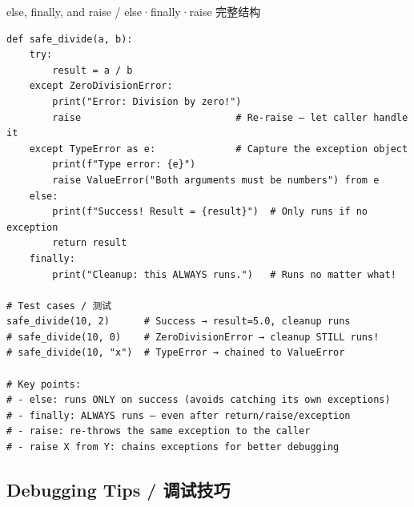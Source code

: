 \documentclass[11pt,a4paper]{report}
\begin{document}
\begin{examplebox}{else, finally, and raise / else·finally·raise 完整结构}
\begin{lstlisting}
def safe_divide(a, b):
    try:
        result = a / b
    except ZeroDivisionError:
        print("Error: Division by zero!")
        raise                           # Re-raise — let caller handle it
    except TypeError as e:              # Capture the exception object
        print(f"Type error: {e}")
        raise ValueError("Both arguments must be numbers") from e
    else:
        print(f"Success! Result = {result}")  # Only runs if no exception
        return result
    finally:
        print("Cleanup: this ALWAYS runs.")   # Runs no matter what!

# Test cases / 测试
safe_divide(10, 2)      # Success → result=5.0, cleanup runs
# safe_divide(10, 0)    # ZeroDivisionError → cleanup STILL runs!
# safe_divide(10, "x")  # TypeError → chained to ValueError

# Key points:
# - else: runs ONLY on success (avoids catching its own exceptions)
# - finally: ALWAYS runs — even after return/raise/exception
# - raise: re-throws the same exception to the caller
# - raise X from Y: chains exceptions for better debugging
\end{lstlisting}
\end{examplebox}

\subsection{Debugging Tips / 调试技巧}
\end{document}
